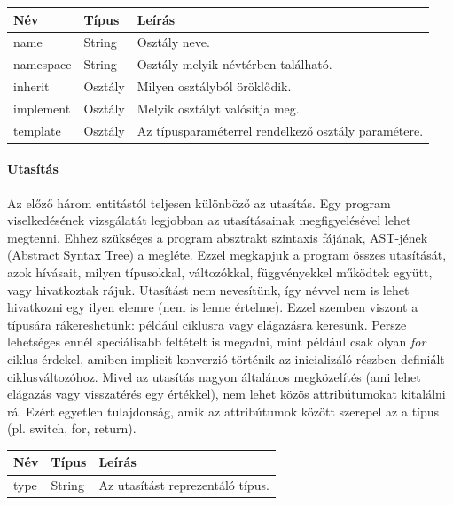 \documentclass[a4paper,12pt]{report}
\begin{document}
\begin{center}
	\begin{tabular}{| l | l | l |}
		\hline
		Név & Típus & Leírás \\ \hline
		name & String & Osztály neve. \\ \hline
		namespace & String & Osztály melyik névtérben található. \\ \hline
		inherit & Osztály & Milyen osztályból öröklődik. \\ \hline
		implement & Osztály & Melyik osztályt valósítja meg. \\ \hline
		template & Osztály & Az típusparaméterrel rendelkező osztály paramétere. \\ \hline
	\end{tabular}
\end{center}
\paragraph{Utasítás}
Az előző három entitástól teljesen különböző az utasítás. Egy program viselkedésének vizsgálatát legjobban az utasításainak megfigyelésével lehet megtenni. Ehhez szükséges a program absztrakt szintaxis fájának, AST-jének (Abstract Syntax Tree) a megléte. Ezzel megkapjuk a program összes utasítását, azok hívásait, milyen típusokkal, változókkal, függvényekkel működtek együtt, vagy hivatkoztak rájuk. Utasítást nem nevesítünk, így névvel nem is lehet hivatkozni egy ilyen elemre (nem is lenne értelme). Ezzel szemben viszont a típusára rákereshetünk: például ciklusra vagy elágazásra keresünk. Persze lehetséges ennél speciálisabb feltételt is megadni, mint például csak olyan \textit{for} ciklus érdekel, amiben implicit konverzió történik az inicializáló részben definiált ciklusváltozóhoz. Mivel az utasítás nagyon általános megközelítés (ami lehet elágazás vagy visszatérés egy értékkel), nem lehet közös attribútumokat kitalálni rá. Ezért egyetlen tulajdonság, amik az attribútumok között szerepel az a típus (pl. switch, for, return).
\begin{center}
	\begin{tabular}{| l | l | l |}
		\hline
		Név & Típus & Leírás \\ \hline
		type & String & Az utasítást reprezentáló típus. \\ \hline
	\end{tabular}
\end{center}
\end{document}
